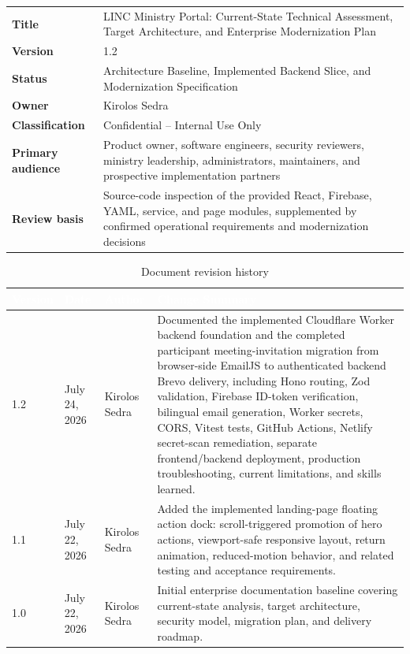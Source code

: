 \documentclass[11pt,a4paper,oneside]{report}
\newcommand{\DocumentTitle}{LINC Ministry Portal}
\newcommand{\DocumentSubtitle}{Current-State Technical Assessment, Target Architecture, and Enterprise Modernization Plan}
\newcommand{\DocumentVersion}{1.2}
\newcommand{\DocumentStatus}{Architecture Baseline, Implemented Backend Slice, and Modernization Specification}
\newcommand{\DocumentAuthor}{Kirolos Sedra}
\newcommand{\DocumentClassification}{Confidential -- Internal Use Only}
\begin{document}
\begin{paramtable}
\begin{tabularx}{\linewidth}{@{}>{\bfseries}l X@{}}
\toprule
Title & \DocumentTitle: \DocumentSubtitle \\
Version & \DocumentVersion \\
Status & \DocumentStatus \\
Owner & \DocumentAuthor \\
Classification & \DocumentClassification \\
Primary audience & Product owner, software engineers, security reviewers, ministry leadership, administrators, maintainers, and prospective implementation partners \\
Review basis & Source-code inspection of the provided React, Firebase, YAML, service, and page modules, supplemented by confirmed operational requirements and modernization decisions \\
\bottomrule
\end{tabularx}
\end{paramtable}

\begin{table}[H]
\centering
{}
\begin{tabularx}{\linewidth}{@{}l l l X@{}}
\toprule
\rowcolor{primary}
\textcolor{white}{\textbf{Version}} & \textcolor{white}{\textbf{Date}} & \textcolor{white}{\textbf{Author}} & \textcolor{white}{\textbf{Change Summary}} \\
\midrule
1.2 & July 24, 2026 & \DocumentAuthor & Documented the implemented Cloudflare Worker backend foundation and the completed participant meeting-invitation migration from browser-side EmailJS to authenticated backend Brevo delivery, including Hono routing, Zod validation, Firebase ID-token verification, bilingual email generation, Worker secrets, CORS, Vitest tests, GitHub Actions, Netlify secret-scan remediation, separate frontend/backend deployment, production troubleshooting, current limitations, and skills learned. \\
1.1 & July 22, 2026 & \DocumentAuthor & Added the implemented landing-page floating action dock: scroll-triggered promotion of hero actions, viewport-safe responsive layout, return animation, reduced-motion behavior, and related testing and acceptance requirements. \\
1.0 & July 22, 2026 & \DocumentAuthor & Initial enterprise documentation baseline covering current-state analysis, target architecture, security model, migration plan, and delivery roadmap. \\
\bottomrule
\end{tabularx}
\caption{Document revision history}
\end{table}
\end{document}
